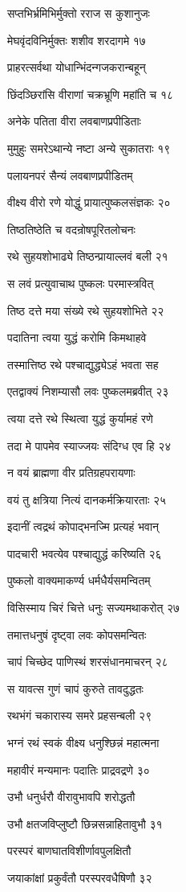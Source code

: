 सप्तभिर्भ्रमिभिर्मुक्तो रराज स कुशानुजः

मेघवृंदविनिर्मुक्तः शशीव शरदागमे १७

प्राहरत्सर्वथा योधान्भिंदन्गजकरान्बहून्

छिंदञ्छिरांसि वीराणां चक्रभ्रूणि महांति च १८

अनेके पतिता वीरा लवबाणप्रपीडिताः

मुमुहुः समरेऽथान्ये नष्टा अन्ये सुकातराः १९

पलायनपरं सैन्यं लवबाणप्रपीडितम्

वीक्ष्य वीरो रणे योद्धुं प्रायात्पुष्कलसंज्ञकः २०

तिष्ठतिष्ठेति च वदन्रोषपूरितलोचनः

रथे सुहयशोभाढ्ये तिष्ठन्प्रायाल्लवं बली २१

स लवं प्रत्युवाचाथ पुष्कलः परमास्त्रवित्

तिष्ठ दत्ते मया संख्ये रथे सुहयशोभिते २२

पदातिना त्वया युद्धं करोमि किमथाहवे

तस्मात्तिष्ठ रथे पश्चाद्युद्ध्येऽहं भवता सह

एतद्वाक्यं निशम्यासौ लवः पुष्कलमब्रवीत् २३

त्वया दत्ते रथे स्थित्वा युद्धं कुर्यामहं रणे

तदा मे पापमेव स्याज्जयः संदिग्ध एव हि २४

न वयं ब्राह्मणा वीर प्रतिग्रहपरायणाः

वयं तु क्षत्रिया नित्यं दानकर्मक्रियारताः २५

इदानीं त्वद्रथं कोपाद्भनज्मि प्रत्यहं भवान्

पादचारी भवत्येव पश्चाद्युद्धं करिष्यति २६

पुष्कलो वाक्यमाकर्ण्य धर्मधैर्यसमन्वितम्

विसिस्माय चिरं चित्ते धनुः सज्यमथाकरोत् २७

तमात्तधनुषं दृष्ट्वा लवः कोपसमन्वितः

चापं चिच्छेद पाणिस्थं शरसंधानमाचरन् २८

स यावत्स गुणं चापं कुरुते तावदुद्धतः

रथभंगं चकारास्य समरे प्रहसन्बली २९

भग्नं रथं स्वकं वीक्ष्य धनुश्छिन्नं महात्मना

महावीरं मन्यमानः पदातिः प्राद्रवद्रणे ३०

उभौ धनुर्धरौ वीरावुभावपि शरोद्धतौ

उभौ क्षतजविप्लुष्टौ छिन्नसन्नाहितावुभौ ३१

परस्परं बाणघातविशीर्णावपुलक्षितौ

जयाकांक्षां प्रकुर्वंतौ परस्परवधैषिणौ ३२

